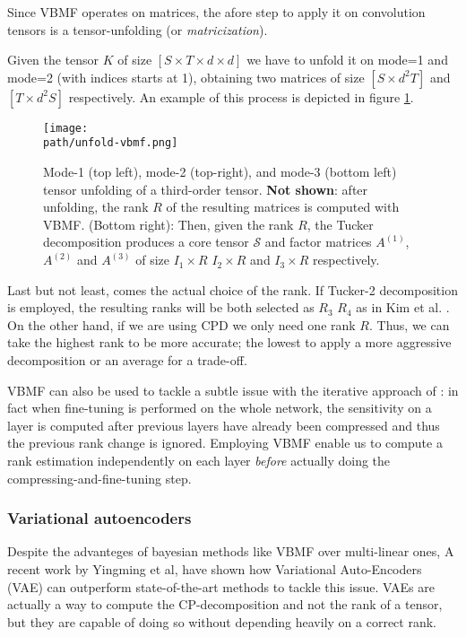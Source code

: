 Since VBMF operates on matrices, the afore step to apply it on convolution tensors is a tensor-unfolding (or \emph{matricization}). 

Given the tensor $K$ of size $[S \times T \times d \times d]$ we have to unfold it on mode=1 and mode=2 (with indices starts at 1), obtaining two matrices of size $[S \times d^2T]$ and $[T \times d^2S]$ respectively. An example of this process is depicted in figure \ref{fig:vbmf}.

\begin{figure}[h!]
 \centering
 \texttt{[image: \\path/unfold-vbmf.png]} 
 \caption[VBMF rank estimation on CONV layer]{Mode-1 (top left), mode-2 (top-right), and mode-3 (bottom left) tensor unfolding of a third-order tensor. \textbf{Not shown}: after unfolding, the rank $R$ of the resulting matrices is computed with VBMF.
 (Bottom right): Then, given the rank $R$, the Tucker decomposition produces a core tensor $\mathcal{S}$ and  factor matrices $A^(1)$, $A^(2)$ and $A^(3)$ of size $I_1 \times R$ $I_2 \times R$ and $I_3 \times R$ respectively. } 
 \label{fig:vbmf}
\end{figure}


Last but not least, comes the actual choice of the rank. If Tucker-2 decomposition is employed, the resulting ranks will be both selected as $R_3$ $R_4$ as in Kim et al. \parencite{Tucker-mobile}. On the other hand, if we are using CPD we only need one rank $R$. Thus, we can take the highest rank to be more accurate;
the lowest to apply a more aggressive decomposition or an average for a trade-off.
\newline 

VBMF can also be used to tackle a subtle issue with the iterative approach of \parencite{astrid2017}: in fact when fine-tuning is performed on the whole network, the sensitivity on a layer is computed after previous layers have already been compressed and thus the previous rank change is ignored. Employing VBMF enable us to compute a rank estimation independently on each layer \emph{before} actually doing the compressing-and-fine-tuning step. 


\subsubsection{Variational autoencoders}
Despite the advanteges of bayesian methods like VBMF over multi-linear ones, 
A recent work by Yingming et al, \parencite{VAE} have shown how Variational Auto-Encoders (VAE) can outperform state-of-the-art methods to tackle this issue. VAEs are actually a way to compute the CP-decomposition and not the rank of a tensor, but they are capable of doing so without depending heavily on a correct rank.
\newline 

